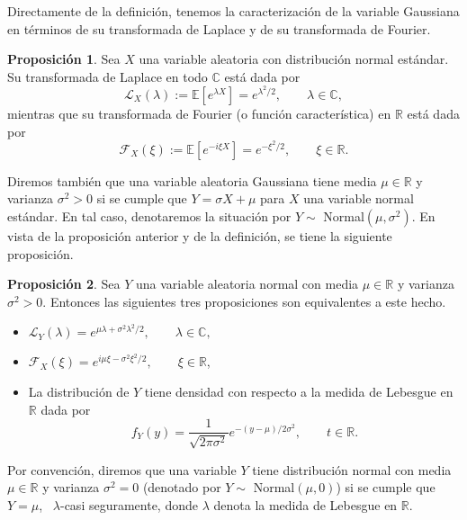 \documentclass[letterpaper,twoside]{book}
\newcommand{\R}{\mathbb{R}}
\newcommand{\C}{\mathbb{C}}
\newcommand{\F}{\mathcal{F}}
\newcommand{\E}{\mathbb{E}}
\newcommand{\1}{\mathds{1}}
\theoremstyle{definition}
\theoremstyle{definition}
\theoremstyle{definition}
\theoremstyle{definition}
\newtheorem{prop}{Proposición}
\theoremstyle{definition}
\theoremstyle{definition}
\theoremstyle{definition}
\begin{document}
Directamente de la definición, tenemos la caracterización de la variable Gaussiana en términos de su transformada de Laplace y de su transformada de Fourier.
\begin{prop} 
 Sea $X$ una variable aleatoria con distribución normal estándar. Su transformada de Laplace en todo $\C$ está dada por 
 \[
 \mathcal{L}_X(\lambda):=\E\left[e^{\lambda X}\right]=e^{\lambda^2/2}, \qquad \lambda\in \C,
 \]
mientras que su transformada de Fourier (o función característica) en $\R$ está dada por 
\[
\mathcal{F}_X(\xi):=\E\left[e^{-i\xi X}\right]=e^{-\xi^2/2}, \qquad \xi \in \R. 
\]
 \end{prop}

Diremos también que una variable aleatoria Gaussiana tiene media $\mu\in \R$ y varianza $\sigma^2>0$ si se cumple que $Y=\sigma X+\mu$ para $X$ una variable normal estándar. En tal caso, denotaremos la situación por $Y\sim$ Normal$(\mu,\sigma^2)$. En vista de la proposición anterior y de la definición, se tiene la siguiente proposición.
\begin{prop} 
 Sea $Y$ una variable aleatoria normal con media $\mu\in \R$ y varianza $\sigma^2>0$. Entonces las siguientes tres proposiciones son equivalentes a este hecho.
 \begin{itemize}
    \item $\mathcal{L}_Y(\lambda)=e^{\mu\lambda+\sigma^2\lambda^2/2}, \qquad \lambda \in \C,$
    \item $\F_X(\xi)=e^{i\mu\xi-\sigma^2\xi^2/2}, \qquad \xi \in \R$,
    \item La distribución de $Y$ tiene densidad con respecto a la medida de Lebesgue en $\R$ dada por 
    \[
        f_Y(y)=\frac{1}{\sqrt{2\pi\sigma^2}}e^{-(y-\mu)/2\sigma^2}, \qquad t\in \R.    
    \]
 \end{itemize}
 \end{prop}
 Por convención, diremos que una variable $Y$ tiene distribución normal con media $\mu\in \R$ y varianza $\sigma^2=0$ (denotado por $Y\sim$ Normal$(\mu,0)$) si se cumple que $Y=\mu$, \  $\lambda$-casi seguramente, donde $\lambda$ denota la medida de Lebesgue en $\R$.
\end{document}
